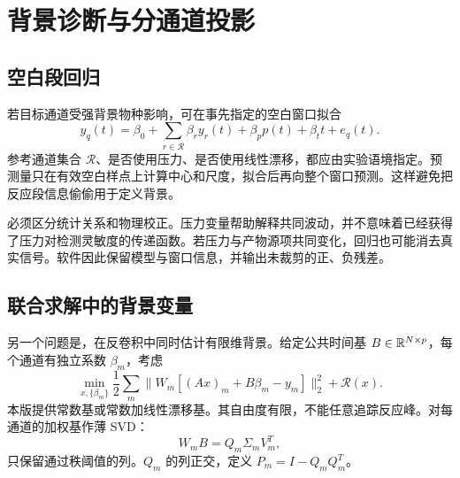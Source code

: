 \chapter{背景诊断与分通道投影}
\section{空白段回归}
若目标通道受强背景物种影响，可在事先指定的空白窗口拟合
\begin{equation}
 y_q(t)=\beta_0+\sum_{r\in\mathcal R}\beta_ry_r(t)
 +\beta_pp(t)+\beta_tt+e_q(t).
\end{equation}
参考通道集合 $\mathcal R$、是否使用压力、是否使用线性漂移，都应由实验语境指定。预测量只在有效空白样点上计算中心和尺度，拟合后再向整个窗口预测。这样避免把反应段信息偷偷用于定义背景。

必须区分统计关系和物理校正。压力变量帮助解释共同波动，并不意味着已经获得了压力对检测灵敏度的传递函数。若压力与产物源项共同变化，回归也可能消去真实信号。软件因此保留模型与窗口信息，并输出未裁剪的正、负残差。

\section{联合求解中的背景变量}
另一个问题是，在反卷积中同时估计有限维背景。给定公共时间基 $B\in\mathbb{R}^{N\times p}$，每个通道有独立系数 $\beta_m$，考虑
\begin{equation}
\min_{x,\{\beta_m\}}\frac12\sum_m
\|W_m[(Ax)_m+B\beta_m-y_m]\|_2^2+\mathcal R(x).\label{eq:jointbg}
\end{equation}
本版提供常数基或常数加线性漂移基。其自由度有限，不能任意追踪反应峰。对每通道的加权基作薄 SVD：
\begin{equation}
 W_mB=Q_m\Sigma_mV_m^T,
\end{equation}
只保留通过秩阈值的列。$Q_m$ 的列正交，定义 $P_m=I-Q_mQ_m^T$。

